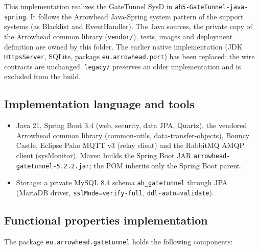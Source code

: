 \documentclass[a4paper]{arrowhead}
\begin{document}
This implementation realizes the GateTunnel SysD in \texttt{ah5-\allowbreak{}GateTunnel-\allowbreak{}java-\allowbreak{}spring}. It follows the Arrowhead Java-Spring system pattern of the support systems (as Blacklist and EventHandler). The Java sources, the private copy of the Arrowhead common library (\texttt{vendor/\allowbreak{}}), tests, images and deployment definition are owned by this folder. The earlier native implementation (JDK \texttt{HttpsServer}, SQLite, package \texttt{eu.\allowbreak{}arrowhead.\allowbreak{}port}) has been replaced; the wire contracts are unchanged. \texttt{legacy/\allowbreak{}} preserves an older implementation and is excluded from the build.

\subsection{Implementation language and tools}
\begin{itemize}
\item Java 21, Spring Boot 3.4 (web, security, data JPA, Quartz), the vendored Arrowhead common library (common-utils, data-transfer-objects), Bouncy Castle, Eclipse Paho MQTT v3 (relay client) and the RabbitMQ AMQP client (sysMonitor). Maven builds the Spring Boot JAR \texttt{arrowhead-\allowbreak{}gatetunnel-\allowbreak{}5.2.2.jar}; the POM inherits only the Spring Boot parent.
\item Storage: a private MySQL 8.4 schema \texttt{ah\_\allowbreak{}gatetunnel} through JPA (MariaDB driver, \texttt{sslMode=verify-full}, \texttt{ddl-auto=validate}).
\end{itemize}

\subsection{Functional properties implementation}

The package \texttt{eu.\allowbreak{}arrowhead.\allowbreak{}gatetunnel} holds the following components:
\end{document}
